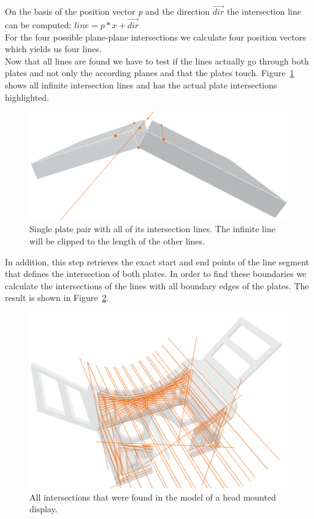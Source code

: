 \documentclass[../ClassicThesis.tex]{subfiles}
\begin{document}
On the basis of the position vector \emph{p} and the direction $\vec{dir}$ the intersection line can be computed: $ line = p*x + \vec{dir}$
\\
For the four possible plane-plane intersections we calculate four position vectors which yields us four lines.\\
Now that all lines are found we have to test if the lines actually go through both plates and not only the according planes and that the plates touch. Figure~\ref{fig:infiniteIntersections} shows all infinite intersection lines and has the actual plate intersections highlighted.
\begin{figure}[!ht]
\centering
\includegraphics[width=1\columnwidth]{Images/06-1-graph-fourIntersectionLines.png}
\caption{Single plate pair with all of its intersection lines. The infinite line will be clipped to the length of the other lines.}
\label{fig:infiniteIntersections}
\end{figure}
In addition, this step retrieves the exact start and end points of the line segment that defines the intersection of both plates. In order to find these boundaries we calculate the intersections of the lines with all boundary edges of the plates. The result is shown in Figure~\ref{fig:allBoundaries}.\\
\begin{figure}[!ht]
\centering
\includegraphics[width=\columnwidth]{Images/AllIntersectionsHMD.png}
\caption{All intersections that were found in the model of a head mounted display. }
\label{fig:allBoundaries}
\end{figure}
\end{document}

